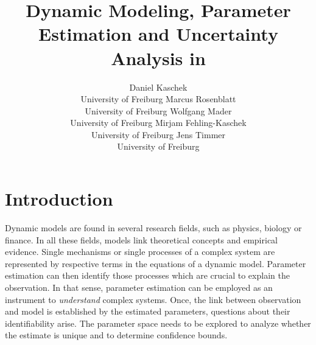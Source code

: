 \documentclass[article]{jss}
\author{Daniel Kaschek\\University of Freiburg \And
	Marcus Rosenblatt\\University of Freiburg \AND
	Wolfgang Mader\\University of Freiburg \And
	Mirjam Fehling-Kaschek\\University of Freiburg \And
	Jens Timmer\\University of Freiburg}
\title{Dynamic Modeling, Parameter Estimation and Uncertainty Analysis in \proglang{R}}
\begin{document}
\section{Introduction}
Dynamic models are found in several research fields, such as physics, biology or finance. In all these fields, models link theoretical concepts and empirical evidence.
Single mechanisms or single processes of a complex system are represented by respective terms in the equations of a dynamic model. Parameter estimation can then identify those processes which are crucial to explain the observation.
In that sense, parameter estimation can be employed as an instrument to \textit{understand} complex systems. Once, the link between observation and model is established by the estimated parameters, questions about their identifiability arise. The parameter space needs to be explored to analyze whether the estimate is unique and to determine confidence bounds.
\end{document}
